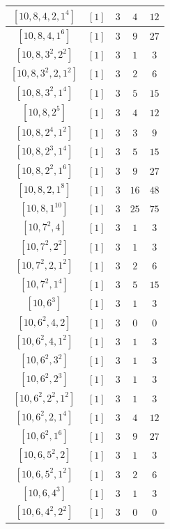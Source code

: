\documentclass{article}%
\begin{document}
\begin{center}
\begin{longtable}{||c|c|c|c|c||}
$[10, 8, 4, 2, 1^{4}]$ & $[1]$ & $3$ & $4$ & $12$ \\ \hline 
$[10, 8, 4, 1^{6}]$ & $[1]$ & $3$ & $9$ & $27$ \\ \hline 
$[10, 8, 3^{2}, 2^{2}]$ & $[1]$ & $3$ & $1$ & $3$ \\ \hline 
$[10, 8, 3^{2}, 2, 1^{2}]$ & $[1]$ & $3$ & $2$ & $6$ \\ \hline 
$[10, 8, 3^{2}, 1^{4}]$ & $[1]$ & $3$ & $5$ & $15$ \\ \hline 
$[10, 8, 2^{5}]$ & $[1]$ & $3$ & $4$ & $12$ \\ \hline 
$[10, 8, 2^{4}, 1^{2}]$ & $[1]$ & $3$ & $3$ & $9$ \\ \hline 
$[10, 8, 2^{3}, 1^{4}]$ & $[1]$ & $3$ & $5$ & $15$ \\ \hline 
$[10, 8, 2^{2}, 1^{6}]$ & $[1]$ & $3$ & $9$ & $27$ \\ \hline 
$[10, 8, 2, 1^{8}]$ & $[1]$ & $3$ & $16$ & $48$ \\ \hline 
$[10, 8, 1^{10}]$ & $[1]$ & $3$ & $25$ & $75$ \\ \hline 
$[10, 7^{2}, 4]$ & $[1]$ & $3$ & $1$ & $3$ \\ \hline 
$[10, 7^{2}, 2^{2}]$ & $[1]$ & $3$ & $1$ & $3$ \\ \hline 
$[10, 7^{2}, 2, 1^{2}]$ & $[1]$ & $3$ & $2$ & $6$ \\ \hline 
$[10, 7^{2}, 1^{4}]$ & $[1]$ & $3$ & $5$ & $15$ \\ \hline 
$[10, 6^{3}]$ & $[1]$ & $3$ & $1$ & $3$ \\ \hline 
$[10, 6^{2}, 4, 2]$ & $[1]$ & $3$ & $0$ & $0$ \\ \hline 
$[10, 6^{2}, 4, 1^{2}]$ & $[1]$ & $3$ & $1$ & $3$ \\ \hline 
$[10, 6^{2}, 3^{2}]$ & $[1]$ & $3$ & $1$ & $3$ \\ \hline 
$[10, 6^{2}, 2^{3}]$ & $[1]$ & $3$ & $1$ & $3$ \\ \hline 
$[10, 6^{2}, 2^{2}, 1^{2}]$ & $[1]$ & $3$ & $1$ & $3$ \\ \hline 
$[10, 6^{2}, 2, 1^{4}]$ & $[1]$ & $3$ & $4$ & $12$ \\ \hline 
$[10, 6^{2}, 1^{6}]$ & $[1]$ & $3$ & $9$ & $27$ \\ \hline 
$[10, 6, 5^{2}, 2]$ & $[1]$ & $3$ & $1$ & $3$ \\ \hline 
$[10, 6, 5^{2}, 1^{2}]$ & $[1]$ & $3$ & $2$ & $6$ \\ \hline 
$[10, 6, 4^{3}]$ & $[1]$ & $3$ & $1$ & $3$ \\ \hline 
$[10, 6, 4^{2}, 2^{2}]$ & $[1]$ & $3$ & $0$ & $0$ \\ \hline 

\end{longtable}
\end{center}
\end{document}

